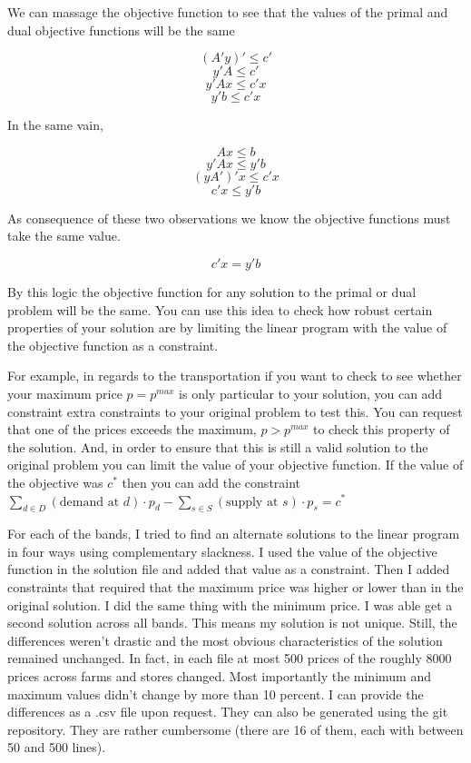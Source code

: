 \documentclass{report}
\begin{document}
We can massage the objective function to see that the values of the primal and dual objective functions will be the same

$$(A'y)' \leq c'$$
$$ y'A \leq c'$$
$$ y'Ax \leq c'x$$
$$y' b \leq c'x$$

In the same vain, 

$$ Ax \leq b$$
$$ y'Ax \leq y'b$$
$$ (yA')'x \leq c'x$$
$$ c'x \leq  y' b $$

As consequence of these two observations we know the objective functions must take the same value.

$$c'x = y' b$$

By this logic the objective function for any solution to the primal or dual problem will be the same. You can use this idea to check how robust certain properties of your solution are by limiting the linear program with the value of the objective function as a constraint. 

For example, in regards to the transportation if you want to check to see whether your maximum price $p = p^{max}$ is only particular to your solution, you can add constraint extra constraints to your original problem to test this. You can request that one of the prices exceeds the maximum, $p > p^{max}$ to check this property of the solution. And, in order to ensure that this is still a valid solution to the original problem you can limit the value of your objective function. If the value of the objective was $c^*$ then you can add the constraint  $ \sum_{d \in D}  (\text{demand at } d) \cdot p_{d} -   \sum_{s \in S}  (\text{supply at } s) \cdot p_{s} = c^*$

For each of the bands, I tried to find an alternate solutions to the linear program in four ways using complementary slackness. I used the value of the objective function in the solution file and added that value as a constraint. Then I added constraints that required that the maximum price was higher or lower than in the original solution. I did the same thing with the minimum price. I was able get a second solution across all bands. This means my solution is not unique. Still, the differences weren't drastic and the most obvious characteristics of the solution remained unchanged. In fact, in each file at most 500 prices of the roughly 8000 prices across farms and stores changed. Most importantly the minimum and maximum values didn't change by more than 10 percent. I can provide the differences as a .csv file upon request. They can also be generated using the git repository. They are rather cumbersome (there are 16 of them, each with between 50 and 500 lines).
\end{document}

